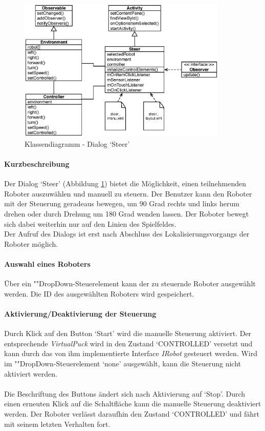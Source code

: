 \documentclass[10pt,a4paper]{article}
\begin{document}
	\begin{figure}[h]
			\centering
			\includegraphics[width=10cm]{images/entwurf_steer.eps}
  			\caption{Klassendiagramm - Dialog `Steer'}
  			\label{fig:dialog_steer}
  	\end{figure}
	
	\paragraph*{Kurzbeschreibung}
	Der Dialog `Steer' (Abbildung \ref{fig:dialog_steer}) bietet die Möglichkeit, einen teilnehmenden Roboter auszuwählen und manuell zu steuern. Der 
	Benutzer kann den Roboter mit der 
	Steuerung geradeaus bewegen, um 90 Grad rechts und links herum drehen oder durch Drehung um 180 Grad wenden lassen. Der Roboter bewegt sich dabei
	weiterhin nur auf den Linien des Spielfeldes. \\
	Der Aufruf des Dialogs ist erst nach Abschluss des Lokalisierungsvorgangs der Roboter möglich.
	
	\paragraph*{Auswahl eines Roboters}
	Über ein ""Drop\-Down-Steu\-er\-ele\-ment kann der zu steuernde Roboter ausgewählt werden. Die ID des ausgewählten Roboters wird gespeichert.
	
	\paragraph*{Aktivierung/Deaktivierung der Steuerung} Durch Klick auf den Button `Start' wird die manuelle Steuerung aktiviert. Der entsprechende
	\textit{VirtualPuck} wird in den Zustand `CONTROLLED' versetzt und kann durch das von ihm implementierte Interface \textit{IRobot} gesteuert werden.
	Wird im ""Drop\-Down-Steu\-er\-ele\-ment `none' ausgewählt, kann die Steuerung nicht aktiviert werden. \\ \\
	Die Beschriftung des Buttons ändert sich nach Aktivierung auf `Stop'. Durch einen erneuten Klick auf die Schaltfläche kann die manuelle Steuerung
	deaktiviert werden. Der Roboter verlässt daraufhin den Zustand `CONTROLLED' und fährt mit seinem letzten Verhalten fort.
	
\end{document}
